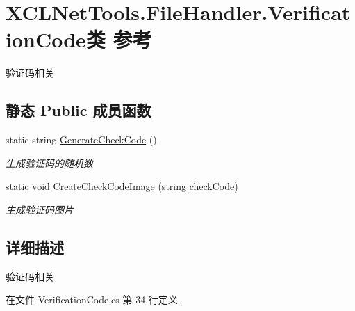 \hypertarget{class_x_c_l_net_tools_1_1_file_handler_1_1_verification_code}{\section{X\-C\-L\-Net\-Tools.\-File\-Handler.\-Verification\-Code类 参考}
\label{class_x_c_l_net_tools_1_1_file_handler_1_1_verification_code}
}


验证码相关  


\subsection*{静态 Public 成员函数}
\begin{DoxyCompactItemize}
\item 
static string \hyperlink{class_x_c_l_net_tools_1_1_file_handler_1_1_verification_code_af4beced22b07b395e6ae37452a895f32}{Generate\-Check\-Code} ()
\begin{DoxyCompactList}\small\item\em 生成验证码的随机数 \end{DoxyCompactList}\item 
static void \hyperlink{class_x_c_l_net_tools_1_1_file_handler_1_1_verification_code_acde0d83935e0d55da7a29725026a72e9}{Create\-Check\-Code\-Image} (string check\-Code)
\begin{DoxyCompactList}\small\item\em 生成验证码图片 \end{DoxyCompactList}\end{DoxyCompactItemize}


\subsection{详细描述}
验证码相关 



在文件 Verification\-Code.\-cs 第 34 行定义.




